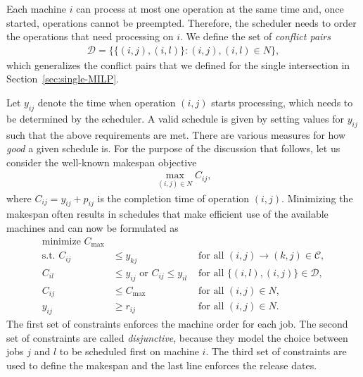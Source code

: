 \documentclass{article}
\theoremstyle{definition}
\theoremstyle{plain}
\begin{document}
Each machine $i$ can process at most one operation at the same time and, once
started, operations cannot be preempted. Therefore, the scheduler needs to order
the operations that need processing on $i$. We define the set of
\textit{conflict pairs}
\begin{align}
  \mathcal{D} = \{ \{(i,j), (i,l)\} : (i,j), (i,l) \in N \},
\end{align}
which generalizes the conflict pairs that we defined for the single intersection
in Section~\ref{sec:single-MILP}.

Let $y_{ij}$ denote the time when operation $(i,j)$ starts processing, which
needs to be determined by the scheduler. A valid schedule is given by setting
values for $y_{ij}$ such that the above requirements are met. There are various
measures for how \textit{good} a given schedule is. For the purpose of the
discussion that follows, let us consider the well-known makespan objective
\begin{align}
\max_{(i,j) \in N} C_{ij},
\end{align}
where $C_{ij} = y_{ij} + p_{ij}$ is the completion time of
operation $(i,j)$. Minimizing the makespan often results in schedules that make
efficient use of the available machines and can now be formulated as
%
\begin{subequations}
  \label{eq:job-shop-natural}
\begin{align}
  \text{minimize } C_{\text{max}} \\
  \text{s.t. } C_{ij} &\leq y_{kj}  & \text{ for all } (i,j) \xrightarrow{} (k,j) \in \mathcal{C}, \\
  C_{il} &\leq  y_{ij} \text{ or } C_{ij} \leq y_{il}  & \text{ for all } \{(i,l), (i,j)\} \in \mathcal{D}, \label{eq:disjunctive-constraints} \\
  C_{ij} &\leq C_{\text{max}} & \text{ for all } (i,j) \in N, \\
  y_{ij} &\geq r_{ij} & \text{ for all } (i,j) \in N.
\end{align}
\end{subequations}
%
The first set of constraints enforces the machine order for each job. The second
set of constraints are called \textit{disjunctive}, because they model the
choice between jobs $j$ and $l$ to be scheduled first on machine $i$. The third
set of constraints are used to define the makespan and the last line enforces
the release dates.
\end{document}
